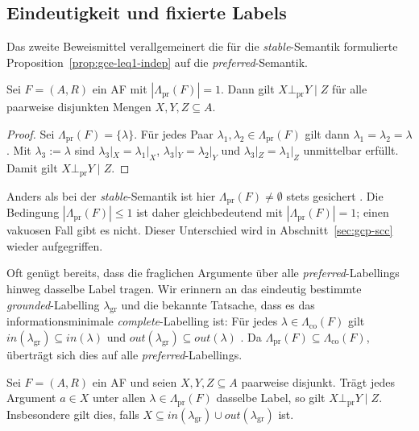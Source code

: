 \subsection{Eindeutigkeit und fixierte Labels}
\label{subsec:gcp-eindeutig}

Das zweite Beweismittel verallgemeinert die f\"ur die \textit{stable}-Semantik
formulierte Proposition~\ref{prop:gce-leq1-indep} auf die
\textit{preferred}-Semantik.

\begin{Proposition}
    \label{prop:gcp-unique-indep}
    Sei \(F=(A,R)\) ein AF mit \(|\Lambda_{\mathrm{pr}}(F)|=1\). Dann gilt
    \(X\bot_{\mathrm{pr}}Y\mid Z\) f\"ur alle paarweise disjunkten Mengen
    \(X,Y,Z\subseteq A\).
\end{Proposition}

\begin{proof}
    Sei \(\Lambda_{\mathrm{pr}}(F)=\{\lambda\}\). F\"ur jedes Paar
    \(\lambda_1,\lambda_2\in\Lambda_{\mathrm{pr}}(F)\) gilt dann
    \(\lambda_1=\lambda_2=\lambda\). Mit \(\lambda_3:=\lambda\) sind
    \(\lambda_3|_X=\lambda_1|_X\), \(\lambda_3|_Y=\lambda_2|_Y\) und
    \(\lambda_3|_Z=\lambda_1|_Z\) unmittelbar erf\"ullt. Damit gilt
    \(X\bot_{\mathrm{pr}}Y\mid Z\).
\end{proof}

Anders als bei der \textit{stable}-Semantik ist hier
\(\Lambda_{\mathrm{pr}}(F)\neq\emptyset\) stets gesichert
\cite{dung:1995:af}. Die Bedingung \(|\Lambda_{\mathrm{pr}}(F)|\leq 1\) ist
daher gleichbedeutend mit \(|\Lambda_{\mathrm{pr}}(F)|=1\); einen vakuosen Fall
gibt es nicht. Dieser Unterschied wird in
Abschnitt~\ref{sec:gcp-scc} wieder aufgegriffen.

Oft gen\"ugt bereits, dass die fraglichen Argumente \"uber alle
\textit{preferred}-Labellings hinweg dasselbe Label tragen. Wir erinnern an das
eindeutig bestimmte \textit{grounded}-Labelling \(\lambda_{\mathrm{gr}}\) und
die bekannte Tatsache, dass es das informationsminimale
\textit{complete}-Labelling ist: F\"ur jedes
\(\lambda\in\Lambda_{\mathrm{co}}(F)\) gilt
\(\mathit{in}(\lambda_{\mathrm{gr}})\subseteq\mathit{in}(\lambda)\) und
\(\mathit{out}(\lambda_{\mathrm{gr}})\subseteq\mathit{out}(\lambda)\)
\cite{dung:1995:af,handbook__of_formal_argumentation__vol__3:2024}. Da
\(\Lambda_{\mathrm{pr}}(F)\subseteq\Lambda_{\mathrm{co}}(F)\), \"ubertr\"agt
sich dies auf alle \textit{preferred}-Labellings.

\begin{Proposition}
    \label{prop:gcp-fixed-label}
    Sei \(F=(A,R)\) ein AF und seien \(X,Y,Z\subseteq A\) paarweise disjunkt.
    Tr\"agt jedes Argument \(a\in X\) unter allen
    \(\lambda\in\Lambda_{\mathrm{pr}}(F)\) dasselbe Label, so gilt
    \(X\bot_{\mathrm{pr}}Y\mid Z\). Insbesondere gilt dies, falls
    \(X\subseteq \mathit{in}(\lambda_{\mathrm{gr}})\cup
    \mathit{out}(\lambda_{\mathrm{gr}})\) ist.
\end{Proposition}

